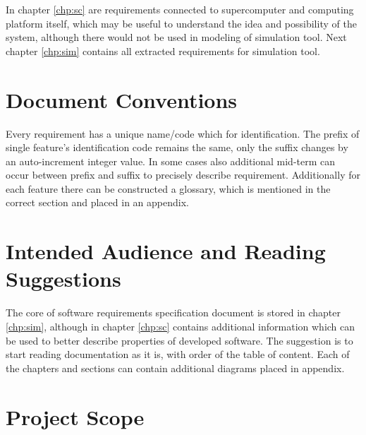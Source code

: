 \documentclass{report}
\begin{document}
In chapter \ref{chp:sc} are requirements connected to supercomputer and computing platform itself, which may be useful to understand the idea and possibility of the system, although there would not be used in modeling of simulation tool. Next chapter \ref{chp:sim} contains all extracted requirements for simulation tool.

\section{Document Conventions}
Every requirement has a unique name/code which for identification. The prefix of single feature's identification code remains the same, only the suffix changes by an auto-increment integer value. In some cases also additional mid-term can occur between prefix and suffix to precisely describe requirement. Additionally for each feature there can be constructed a glossary, which is mentioned in the correct section and placed in an appendix. 
\section{Intended Audience and Reading Suggestions}
The core of software requirements specification document is stored in chapter \ref{chp:sim}, although in chapter \ref{chp:sc} contains additional information which can be used to better describe properties of developed software. The suggestion is to start reading documentation as it is, with order of the table of content. Each of the chapters and sections can contain additional diagrams placed in appendix. 

\section{Project Scope}
\end{document}
